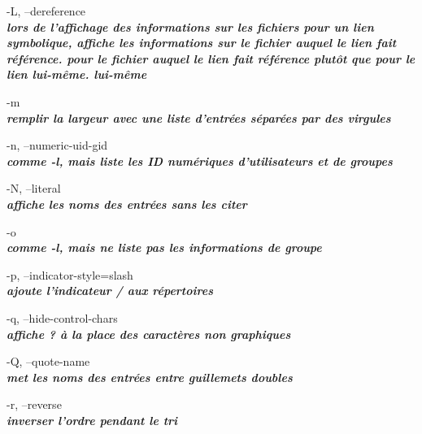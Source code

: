 \documentclass{article}
\begin{document}
      \par -L, --dereference\\  
             \textit{\textbf{ lors de l'affichage des informations sur les fichiers pour un lien symbolique, affiche les informations sur le fichier auquel le lien fait référence.
              pour le fichier auquel le lien fait référence plutôt que pour le lien lui-même.
              lui-même}}\\

       \par-m\\   \textit{\textbf{remplir la largeur avec une liste d'entrées séparées par des virgules}}\\

       \par -n, --numeric-uid-gid\\  
               \textit{\textbf{comme -l, mais liste les ID numériques d'utilisateurs et de groupes}}\\

        \par-N, --literal\\  
              \textit{\textbf{affiche les noms des entrées sans les citer}}\\

       \par -o \\      \textit{\textbf{comme -l, mais ne liste pas les informations de groupe}}\\

       \par -p, --indicator-style=slash \\ 
              \textit{\textbf{ajoute l'indicateur / aux répertoires}}\\

        \par-q, --hide-control-chars\\
              \textit{\textbf{affiche ? à la place des caractères non graphiques}}\\

        \par-Q, --quote-name\\
              \textit{\textbf{met les noms des entrées entre guillemets doubles}}\\


       \par-r, --reverse\\
               \textit{\textbf{inverser l'ordre pendant le tri}}\\
\end{document}
